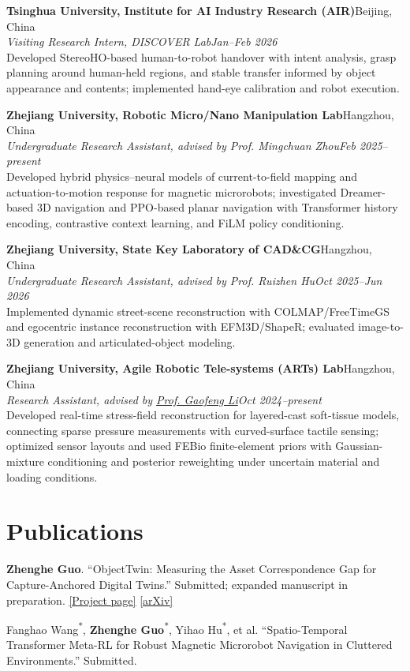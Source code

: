 \documentclass[10pt,letterpaper]{article}
\newcommand{\entry}[4]{\textbf{#1}\hfill #2\\\textit{#3}\hfill\textit{#4}\\[-1pt]}
\newcommand{\link}[2]{\href{#1}{\textcolor{accent}{\underline{#2}}}}
\begin{document}
\entry{Tsinghua University, Institute for AI Industry Research (AIR)}{Beijing, China}{Visiting Research Intern, DISCOVER Lab}{Jan--Feb 2026}
Developed StereoHO-based human-to-robot handover with intent analysis, grasp planning around human-held regions, and stable transfer informed by object appearance and contents; implemented hand-eye calibration and robot execution.

\entry{Zhejiang University, Robotic Micro/Nano Manipulation Lab}{Hangzhou, China}{Undergraduate Research Assistant, advised by Prof. Mingchuan Zhou}{Feb 2025--present}
Developed hybrid physics--neural models of current-to-field mapping and actuation-to-motion response for magnetic microrobots; investigated Dreamer-based 3D navigation and PPO-based planar navigation with Transformer history encoding, contrastive context learning, and FiLM policy conditioning.

\entry{Zhejiang University, State Key Laboratory of CAD\&CG}{Hangzhou, China}{Undergraduate Research Assistant, advised by Prof. Ruizhen Hu}{Oct 2025--Jun 2026}
Implemented dynamic street-scene reconstruction with COLMAP/FreeTimeGS and egocentric instance reconstruction with EFM3D/ShapeR; evaluated image-to-3D generation and articulated-object modeling.

\entry{Zhejiang University, Agile Robotic Tele-systems (ARTs) Lab}{Hangzhou, China}{Research Assistant, advised by \href{https://scholar.google.com/citations?user=EFpCF6oAAAAJ\&hl=en}{Prof. Gaofeng Li}}{Oct 2024--present}
Developed real-time stress-field reconstruction for layered-cast soft-tissue models, connecting sparse pressure measurements with curved-surface tactile sensing; optimized sensor layouts and used FEBio finite-element priors with Gaussian-mixture conditioning and posterior reweighting under uncertain material and loading conditions.

\section{Publications}
\textbf{Zhenghe Guo}. ``ObjectTwin: Measuring the Asset Correspondence Gap for Capture-Anchored Digital Twins.'' Submitted; expanded manuscript in preparation. \link{https://styokuok.github.io/sim_ready/}{[Project page]} \link{https://arxiv.org/abs/2610.35904}{[arXiv]}

\vspace{3pt}
Fanghao Wang\textsuperscript{*}, \textbf{Zhenghe Guo}\textsuperscript{*}, Yihao Hu\textsuperscript{*}, et al. ``Spatio-Temporal Transformer Meta-RL for Robust Magnetic Microrobot Navigation in Cluttered Environments.'' Submitted.
\end{document}
